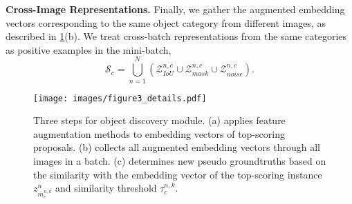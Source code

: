 \documentclass[runningheads]{llncs}
\begin{document}
\noindent\textbf{Cross-Image Representations.}
Finally, we gather the augmented embedding vectors corresponding to the same object category from different images, as described in \cref{fig:figure3_details}(b).
We treat cross-batch representations from the same categories as positive examples in the mini-batch,
\begin{equation}
    \mathcal{S}_c = \bigcup_{n=1}^N ( \mathcal{Z}^{n,c}_{IoU} \cup \mathcal{Z}^{n,c}_{mask} \cup \mathcal{Z}^{n,c}_{noise} )
\label{eq:cross}
.\end{equation}


\begin{figure}[t!]
\centering
\texttt{[image: images/figure3\_details.pdf]}
\caption{Three steps for object discovery module.
(a) applies feature augmentation methods to embedding vectors of top-scoring proposals.
(b) collects all augmented embedding vectors through all images in a batch.
(c) determines new pseudo groundtruths based on the similarity with the embedding vector of the top-scoring instance $z^{n}_{\bar{m}^{n,k}_c}$ and similarity threshold $\tau^{n,k}_c$.}
\label{fig:figure3_details}
\end{figure}
\end{document}
